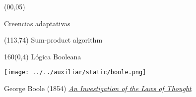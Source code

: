 \documentclass[shownotes,aspectratio=169]{beamer}
\begin{document}
\color{black!85}
\large
 


\begin{frame}
 
 \begin{textblock}{90}(00,05)
\begin{center}
 \huge  \textcolor{black!66}{Creencias adaptativas}
\end{center}
\end{textblock}

{}

 \begin{textblock}{47}(113,74)
\centering \large  \textcolor{white!55}{Sum-product algorithm}
\end{textblock}

\end{frame}


\begin{frame}[plain]
\begin{textblock}{160}(0,4)
 \centering \LARGE Lógica Booleana 
 \end{textblock}
 \vspace{1.5cm} \centering

 \texttt{[image: ../../auxiliar/static/boole.png]}

 \normalsize
 \hfill George Boole (1854) \href{https://downloads.tuxfamily.org/openmathdep/logic_ante_1900/Laws_of_Thought-Boole.pdf}{\emph{An Investigation of the Laws of Thought}} 
\end{frame}
\end{document}
